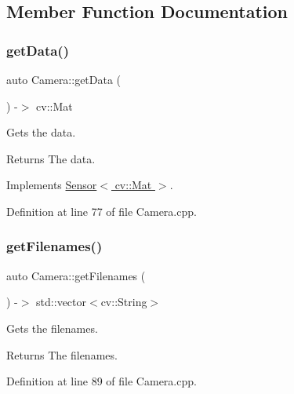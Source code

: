 \subsection{Member Function Documentation}
\mbox{\label{class_camera_acd484ba9de5bb9f6a86bf40396dc4e69}} 
\subsubsection{\texorpdfstring{get\+Data()}{getData()}}
{\footnotesize\ttfamily auto Camera\+::get\+Data (\begin{DoxyParamCaption}{ }\end{DoxyParamCaption}) -\/$>$ cv\+::\+Mat\hspace{0.3cm}{\ttfamily [virtual]}}



Gets the data. 

\begin{DoxyReturn}{Returns}
The data. 
\end{DoxyReturn}


Implements \hyperlink{class_sensor_ae9ab3f3715367df03900706eb9806afd}{Sensor$<$ cv\+::\+Mat $>$}.



Definition at line 77 of file Camera.\+cpp.

\mbox{\label{class_camera_a6d379d7a64c1469edad924b925cdcb1d}} 
\subsubsection{\texorpdfstring{get\+Filenames()}{getFilenames()}}
{\footnotesize\ttfamily auto Camera\+::get\+Filenames (\begin{DoxyParamCaption}{ }\end{DoxyParamCaption}) -\/$>$ std\+::vector$<$cv\+::\+String$>$}



Gets the filenames. 

\begin{DoxyReturn}{Returns}
The filenames. 
\end{DoxyReturn}


Definition at line 89 of file Camera.\+cpp.

\mbox{\label{class_camera_a4e83407793c8388903a37e29925e4bb5}} 
